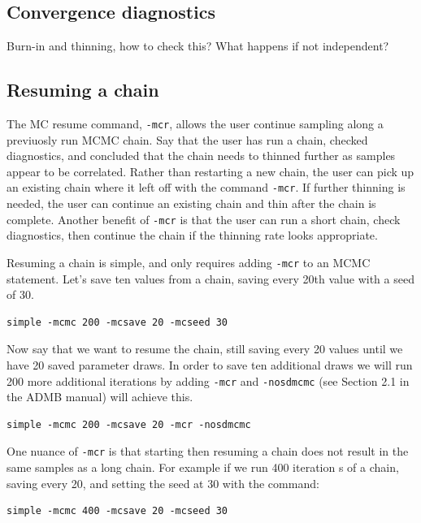 \documentclass{article}\usepackage[]{graphicx}\usepackage[]{color}
\begin{document}
\subsection{Convergence diagnostics} \label{sec:diag}
Burn-in and thinning, how to check this? What happens if not
independent?

\subsection{Resuming a chain}\label{sec:restart}
The MC resume command, \texttt{-mcr}, allows the user continue sampling along 
a previuosly run MCMC chain. Say that the user has run a chain, checked 
diagnostics, and concluded that the chain needs to thinned further as samples 
appear to be correlated. Rather than restarting a new chain, the user can pick 
up an existing chain where it left off with the command \texttt{-mcr}. If 
further thinning is needed, the user can continue an existing chain and 
thin after the chain is complete. Another benefit of \texttt{-mcr} is that
the user can run a short chain, check diagnostics, then continue the chain if 
the thinning rate looks appropriate.

Resuming a chain is simple, and only requires adding \texttt{-mcr} to an MCMC 
statement. 
Let's save ten values from a chain, saving every 20th value with a seed of 30.

\begin{verbatim}
simple -mcmc 200 -mcsave 20 -mcseed 30
\end{verbatim}

Now say that we want to resume the chain, still saving every 20 values until we 
have 20 saved parameter draws. In order to save ten additional draws we will 
run 200 more additional iterations by adding \texttt{-mcr} and 
\texttt{-nosdmcmc} (see Section 2.1 in the ADMB manual) will achieve this. 

\begin{verbatim}
simple -mcmc 200 -mcsave 20 -mcr -nosdmcmc
\end{verbatim}

One nuance of \texttt{-mcr} is that starting then resuming a chain does not
result in the same samples as a long chain. For example if we run 400 iteration
s of a chain, saving every 20, and setting the seed at 30 with the command:

\begin{verbatim}
simple -mcmc 400 -mcsave 20 -mcseed 30
\end{verbatim}
\end{document}
